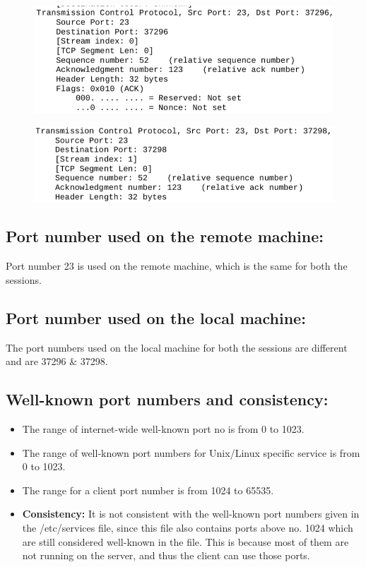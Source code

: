 \documentclass[]{report}
\begin{document}
\begin{figure}[H]
	\vspace{0pt}
	\includegraphics[width=600pt, keepaspectratio, center]{Snapshots/exe10/session1.png}
\end{figure} 
\begin{figure}[H]
	\vspace{0pt}
	\includegraphics[width=600pt, keepaspectratio, center]{Snapshots/exe10/session2.png}
\end{figure} 

\subsection{Port number used on the remote machine: }
Port number 23 is used on the remote machine, which is the same for both the sessions.

\subsection{Port number used on the local machine: }
The port numbers used on the local machine for both the sessions are different and are 37296 \& 37298. 

\subsection{Well-known port numbers and consistency: }
\begin{itemize}
	\item The range of internet-wide well-known port no is from 0 to 1023.
	\item The range of well-known port numbers for Unix/Linux specific service is from 0 to 1023. 
	\item The range for a client port number is from 1024 to 65535.
	\item \textbf{Consistency:} It is not consistent with the well-known port numbers given in the /etc/services file, since this file also contains ports above no. 1024 which are still considered well-known in the file. This is because most of them are not running on the server, and thus the client can use those ports.
\end{itemize} 
\end{document}

